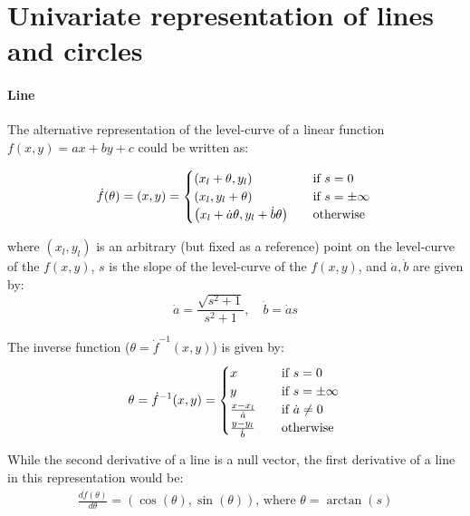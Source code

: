 \section{Univariate representation of lines and circles} \label{app:alternativeRep}

\paragraph{Line}
The alternative representation of the level-curve of a linear function $f(x,y)=ax+by+c$ could be written as:

\[
\dot{f}(\theta) = (x,y) =
\begin{cases}
  \left( x_l + \theta, y_l \right) & \quad \text{if } s = 0\\
  \left( x_l, y_l + \theta \right) & \quad \text{if } s = \pm \infty\\
  \left( x_l + \dot{a}\theta , y_l + \dot{b}\theta \right) & \quad \text{otherwise} \\
\end{cases}\\
\]

where $(x_l,y_l)$ is an arbitrary (but fixed as a reference) point on the level-curve of the $f(x,y)$, $s$ is the slope of the level-curve of the $f(x,y)$, and $\dot{a}, \dot{b}$ are given by:
\[
\dot{a} = \frac{\sqrt{ s^2 + 1}}{s^2 + 1}, \quad \dot{b} = \dot{a}s
\]

The inverse function ($\theta = \dot{f}^{-1}(x,y)$) is given by:
\[
\theta = \dot{f}^{-1}(x,y) =
\begin{cases}
  x & \quad \text{if } s = 0\\
  y & \quad \text{if } s = \pm \infty\\
  \frac{x-x_l}{\dot{a}} & \quad \text{if } \dot{a} \neq 0\\
  \frac{y-y_l}{\dot{b}} & \quad \text{otherwise} \\
\end{cases}\\
\]

While the second derivative of a line is a null vector, the first derivative of a line in this representation would be:
\[
\begin{array}{l}
  \frac{d\dot{f}(\theta)}{d\theta} = \left( \cos(\theta) , \sin(\theta) \right) \text{, where } \theta = \arctan(s)\\
\end{array}
\]



